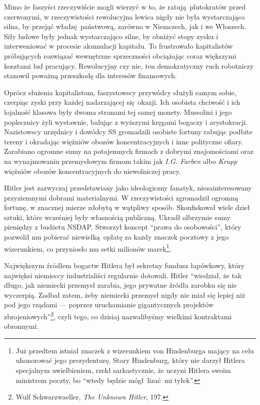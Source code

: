 \documentclass[12pt]{book}
\begin{document}
Mimo że faszyści rzeczywiście mogli wierzyć w to, że ratują plutokratów przed czerwonymi, w rzeczywistości rewolucyjna lewica nigdy nie była wystarczająco silna, by przejąć władzę państwową, zarówno w Niemczech, jak i we Włoszech. Siły ludowe były jednak wystarczająco silne, by obniżyć stopy zysku i interweniować w procesie akumulacji kapitału. To frustrowało kapitalistów próbujących rozwiązać wewnętrzne sprzeczności obciążając coraz większymi kosztami lud pracujący. Rewolucyjny czy nie, ten demokratyczny ruch robotniczy stanowił poważną przeszkodę dla interesów finansowych.

Oprócz służenia kapitalistom, faszystowscy przywódcy służyli samym sobie, czerpiąc zyski przy każdej nadarzającej się okazji. Ich osobista chciwość i ich lojalność klasowa były dwoma stronami tej samej monety. Mussolini i jego poplecznicy żyli wystawnie, balując z wyższymi kręgami bogaczy i arystokracji. Nazistowscy urzędnicy i dowódcy SS gromadzili osobiste fortuny rabując podbite tereny i okradając więźniów obozów koncentracyjnych i inne polityczne ofiary. Zarabiano ogromne sumy na potajemnych firmach z dobrymi znajomościami oraz na wynajmowaniu przemysłowym firmom takim jak \textit{I.G. Farben} albo \textit{Krupp} więźniów obozów koncentracyjnych do niewolniczej pracy.

Hitler jest zazwyczaj przedstawiany jako ideologiczny fanatyk, niezainteresowany przyziemnymi dobrami materialnymi. W rzeczywistości zgromadził ogromną fortunę, w znacznej mierze zdobytą w wątpliwy sposób. Skonfiskował wiele dzieł sztuki, które wcześniej były własnością publiczną. Ukradł olbrzymie sumy pieniędzy z budżetu NSDAP. Stworzył koncept ``prawa do osobowości'', który pozwolił mu pobierać niewielką opłatę za każdy znaczek pocztowy z jego wizerunkiem, co przyniosło mu setki milionów marek\footnote{Już przedtem istniał znaczek z wizerunkiem von Hindenburga mający na celu uhonorować jego prezydenturę. Stary Hindenburg, który nie darzył Hitlera specjalnym uwielbieniem, rzekł sarkastycznie, że uczyni Hitlera swoim ministrem poczty, bo ``wtedy będzie mógł lizać mi tyłek''.}.

Największym źródłem bogactw Hitlera był sekretny fundusz łapówkowy, który najwięksi niemieccy industrialiści regularnie dotowali. Hitler ``wiedział, że tak długo, jak niemiecki przemysł zarabia, jego prywatne źródła zarobku się nie wyczerpią. Zadbał zatem, żeby niemiecki przemysł nigdy nie miał się lepiej niż pod jego rządami — poprzez uruchamianie gigantycznych projektów zbrojeniowych''\footnote{Wulf Schwarzwaeller, \textit{The Unknown Hitler}, 197.}, czyli tego, co dzisiaj nazwalibyśmy wielkimi kontraktami obronnymi.
\end{document}
